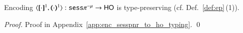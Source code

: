 \begin{proposition}\rm
	Encoding $\encod{\cdot}{\cdot}{1}: \sespnr \to \HO$  is type-preserving (cf. Def.~\ref{def:ep}\,(1)).\rm
\end{proposition}

\begin{proof}
	Proof in Appendix~\ref{app:enc_sesspnr_to_ho_typing}.
	\qed
\end{proof}

\begin{comment}
\begin{proof}
	By induction on the structure of \sesp process $P$.
%
	\begin{enumerate}[1.]
		\item	Case $P = \bout{k}{n}P'$. There are two sub-cases.
			In the first sub-case $n = k'$ (output of a linear channel). Then  
			we have the following typing in the source language:
			{\small
			\[
				\tree{
					\Gamma; \emptyset; \Sigma \cat k:S  \proves  P' \hastype \Proc \quad \Gamma ; \emptyset ; \{k' : S_1\} \proves  k' \hastype S_1}{
					\Gamma; \emptyset; \Sigma \cat k':S_1 \cat k:\btout{S_1}S \proves  \bout{k}{k'} P' \hastype \Proc}
			\]
			}
			The corresponding typing in the target language is as follows --- we write $U_1$ to stand for $\lhot{\btinp{\lhot{\tmap{S_1}{1}}}\tinact}$:
			{\small
			\[
				\tree{
					\tree{}{\tmap{\Gamma}{1}; \emptyset ; \tmap{\Sigma}{1} \cat k:\tmap{S}{1} \proves \pmap{P'}{1} \hastype \Proc}
					~~
					\tree{
						\tree{
							\tree{
								\tree{
									\tree{}{\tmap{\Gamma}{1} ; \{X : \lhot{\tmap{S_1}{1}}\} ; \emptyset \proves \X  \hastype \lhot{\tmap{S_1}{1}}} 
									\quad 
									\tree{}{\tmap{\Gamma}{1} ; \emptyset ; \{k' : \tmap{S_1}{1}\} \proves  k' \hastype \tmap{S_1}{1}}}{\tmap{\Gamma}{1} ; \{X : \lhot{\tmap{S_1}{1}}\} ; k' : \tmap{S_1}{1} \proves \appl{\X}{k'} \hastype \Proc}}{\tmap{\Gamma}{1} ; \{X : \lhot{\tmap{S_1}{1}}\} ; k' : 	\tmap{S_1}{1} \cat z:\tinact \proves \appl{\X}{k'} \hastype \Proc}
						}{
							\tmap{\Gamma}{1} ; \emptyset; k' : \tmap{S_1}{1} \cat z:\btinp{\lhot{\tmap{S_1}{1}}}\tinact \proves \binp{z}{X} \appl{\X}{k'} \hastype \Proc
						}
					}{
						\tmap{\Gamma}{1} ; \emptyset; k' : \tmap{S_1}{1} \proves \abs{z}{\binp{z}{X} \appl{\X}{k'}} \hastype U_1
					}
				}{
				\tmap{\Gamma}{1}; \emptyset; \tmap{\Sigma}{1} \cat k':\tmap{S_1}{1} \cat k:\btout{U_1}\tmap{S}{1} \proves  \bbout{k}{\abs{z}{\binp{z}{X} \appl{\X}{k'}}} \pmap{P'}{1} \hastype \Proc
				}
			\]
			}
	

\end{comment}
